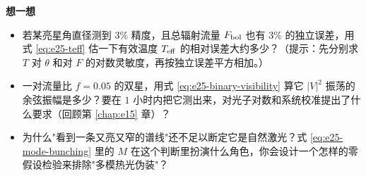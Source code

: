 \medskip
\noindent\textbf{想一想}
\begin{itemize}
  \item 若某亮星角直径测到 \(3\%\) 精度，且总辐射流量 \(F_{\rm bol}\) 也有 \(3\%\) 的独立误差，用式 \eqref{eq:e25-teff} 估一下有效温度 \(T_{\rm eff}\) 的相对误差大约多少？（提示：先分别求 \(T\) 对 \(\theta\) 和对 \(F\) 的对数灵敏度，再按独立误差平方相加。）
  \item 一对流量比 \(f=0.05\) 的双星，用式 \eqref{eq:e25-binary-visibility} 算它 \(|V|^2\) 振荡的余弦振幅是多少？要在 \(1\) 小时内把它测出来，对光子对数和系统校准提出了什么要求（回顾第 \ref{chap:e15} 章）？
  \item 为什么"看到一条又亮又窄的谱线"还不足以断定它是自然激光？式 \eqref{eq:e25-mode-bunching} 里的 \(M\) 在这个判断里扮演什么角色，你会设计一个怎样的零假设检验来排除"多模热光伪装"？
\end{itemize}
